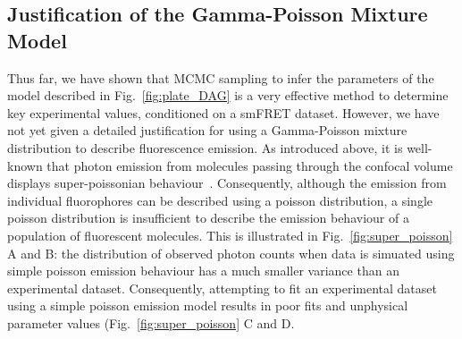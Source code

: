 \subsection{Justification of the Gamma-Poisson Mixture Model}
\label{subsec:justification}
Thus far, we have shown that MCMC sampling to infer the parameters of the model described in Fig.~\ref{fig:plate_DAG} is a very effective method to determine key experimental values, conditioned on a smFRET dataset. However, we have not yet given a detailed justification for using a Gamma-Poisson mixture distribution to describe fluorescence emission. As introduced above, it is well-known that photon emission from molecules passing through the confocal volume displays super-poissonian behaviour~\cite{chen99}. Consequently, although the emission from individual fluorophores can be described using a poisson distribution, a single poisson distribution is insufficient to describe the emission behaviour of a population of fluorescent molecules. This is illustrated in Fig.~\ref{fig:super_poisson} A and B: the distribution of observed photon counts when data is simuated using simple poisson emission behaviour has a much smaller variance than an experimental dataset. Consequently, attempting to fit an experimental dataset using a simple poisson emission model results in poor fits and unphysical parameter values (Fig.~\ref{fig:super_poisson} C and D.


